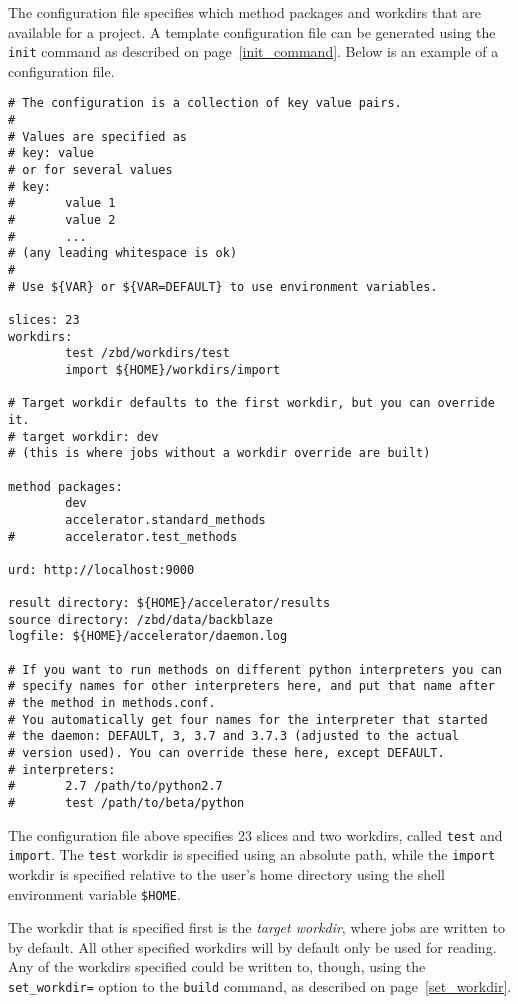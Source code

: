 The configuration file specifies which method packages and workdirs
that are available for a project.  A template configuration file can
be generated using the \texttt{init} command as described on
page~\ref{init_command}.  Below is an example of a configuration file.
\begin{snugshade}
\begin{verbatim}
# The configuration is a collection of key value pairs.
#
# Values are specified as
# key: value
# or for several values
# key:
#       value 1
#       value 2
#       ...
# (any leading whitespace is ok)
#
# Use ${VAR} or ${VAR=DEFAULT} to use environment variables.

slices: 23
workdirs:
        test /zbd/workdirs/test
        import ${HOME}/workdirs/import

# Target workdir defaults to the first workdir, but you can override it.
# target workdir: dev
# (this is where jobs without a workdir override are built)

method packages:
        dev
        accelerator.standard_methods
#       accelerator.test_methods   

urd: http://localhost:9000

result directory: ${HOME}/accelerator/results
source directory: /zbd/data/backblaze
logfile: ${HOME}/accelerator/daemon.log

# If you want to run methods on different python interpreters you can
# specify names for other interpreters here, and put that name after
# the method in methods.conf.
# You automatically get four names for the interpreter that started
# the daemon: DEFAULT, 3, 3.7 and 3.7.3 (adjusted to the actual
# version used). You can override these here, except DEFAULT.
# interpreters:
#       2.7 /path/to/python2.7
#       test /path/to/beta/python  
\end{verbatim}
\end{snugshade}%

The configuration file above specifies 23 slices and two workdirs,
called \texttt{test} and \texttt{import}.  The \texttt{test} workdir
is specified using an absolute path, while the \texttt{import} workdir
is specified relative to the user's home directory using the shell
environment variable \texttt{\$HOME}.

The workdir that is specified first is the \textsl{target workdir},
where jobs are written to by default.  All other specified workdirs
will by default only be used for reading.  Any of the workdirs
specified could be written to, though, using the
\texttt{set\_workdir=} option to the \texttt{build} command, as
described on page~\ref{set_workdir}.

